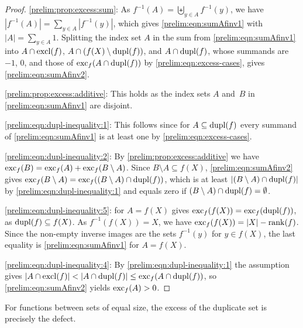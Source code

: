 \begin{proof}	
	\ref{prelim:prop:excess:sum}: As $f^{-1}(A) = \biguplus_{y \in A} f^{-1}(y)$,
	we have $|f^{-1}(A)| = \sum_{y \in A} |f^{-1}(y)|$,
	which gives \cref{prelim:eqn:sumAfinv1} with $|A| = \sum_{y \in A} 1$.	
	Splitting the index set $A$ in the sum from \cref{prelim:eqn:sumAfinv1}
	into $A \cap \operatorname{excl}(f)$, $A \cap (f(X) \setminus \operatorname{dupl}(f))$,
	and $A \cap \operatorname{dupl}(f)$, whose summands are $-1$, $0$, and those of
	$\operatorname{exc}_{f}(A \cap \operatorname{dupl}(f))$ by \cref{prelim:eqn:excess-cases}, gives
	\cref{prelim:eqn:sumAfinv2}.

	\ref{prelim:prop:excess:additive}: This holds as the index sets $A$ and~$B$ in \cref{prelim:eqn:sumAfinv1} are disjoint.

	\ref{prelim:eqn:dupl-inequality:1}: This follows since for $A \subseteq \operatorname{dupl}(f)$ every summand of \cref{prelim:eqn:sumAfinv1} is at least one by \cref{prelim:eqn:excess-cases}.
		
	\ref{prelim:eqn:dupl-inequality:2}:
	By \cref{prelim:prop:excess:additive}
	we have $\operatorname{exc}_{f}(B) = \operatorname{exc}_{f}(A) + \operatorname{exc}_{f}(B \setminus A)$.
	Since $B \setminus A \subseteq f(X)$, \cref{prelim:eqn:sumAfinv2} gives
	$\operatorname{exc}_{f}(B \setminus A) = \operatorname{exc}_{f}((B \setminus A) \cap \operatorname{dupl}(f))$,
	which is at least $|(B \setminus A) \cap \operatorname{dupl}(f)|$
	by \cref{prelim:eqn:dupl-inequality:1}
	and equals zero if $(B \setminus A) \cap \operatorname{dupl}(f) = \emptyset$.
		
	\ref{prelim:eqn:dupl-inequality:5}:  for
	$A = f(X)$ gives $\operatorname{exc}_{f}(f(X)) = \operatorname{exc}_{f}(\operatorname{dupl}(f))$, as
	$\operatorname{dupl}(f) \subseteq f(X)$.
	As $f^{-1}(f(X)) = X$, we have
	$\operatorname{exc}_{f}(f(X)) = |X| - \operatorname{rank}(f)$.
	Since the non-empty inverse images are the sets $f^{-1}(y)$ for $y \in f(X)$,
	the last equality is \cref{prelim:eqn:sumAfinv1} for $A = f(X)$.
	
	\ref{prelim:eqn:dupl-inequality:4}: By \cref{prelim:eqn:dupl-inequality:1} the
	assumption gives $|A \cap \operatorname{excl}(f)| < |A \cap \operatorname{dupl}(f)| \le \operatorname{exc}_{f}(A \cap \operatorname{dupl}(f))$,
	so \cref{prelim:eqn:sumAfinv2} yields $\operatorname{exc}_{f}(A) > 0$.
\end{proof}

For functions between sets of equal size, the excess of the duplicate set
is precisely the defect.

